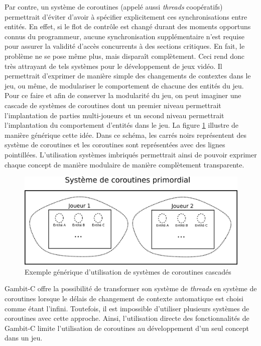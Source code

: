 \documentclass[12pt,oneside,letterpaper,francais]{book}
\begin{document}
Par contre, un système de coroutines (appelé aussi \textit{threads}
coopératifs) permettrait d'éviter d'avoir à spécifier explicitement
ces synchronisations entre entités. En effet, si le flot de contrôle
est changé durant des moments opportuns connus du programmeur, aucune
synchronisation supplémentaire n'est requise pour assurer la validité
d'accès concurrents à des sections critiques. En fait, le problème ne
se pose même plus, mais disparaît complètement. Ceci rend donc très
attrayant de tels systèmes pour le développement de jeux vidéo. Il
permettrait d'exprimer de manière simple des changements de contextes
dans le jeu, ou même, de modulariser le comportement de chacune des
entités du jeu. Pour ce faire et afin de conserver la modularité du
jeu, on peut imaginer une cascade de systèmes de coroutines dont un
premier niveau permettrait l'implantation de parties multi-joueurs et
un second niveau permettrait l'implantation du comportement d'entités
dans le jeu. La figure \ref{Corout:usecase} illustre de manière
générique cette idée. Dans ce schéma, les carrés noirs représentent
des système de coroutines et les coroutines sont représentées avec des
lignes pointillées. L'utilisation systèmes imbriqués permettrait ainsi
de pouvoir exprimer chaque concept de manière modulaire de manière
complètement transparente.

\begin{figure}[htb!]
  \center
  \includegraphics[scale=1.2]{corout-usecase-design}
  \caption{Exemple générique d'utilisation de systèmes de coroutines
    cascadés}
  \label{Corout:usecase}
\end{figure}

Gambit-C offre la possibilité de transformer son système de
\textit{threads} en système de coroutines lorsque le délais de
changement de contexte automatique est choisi comme étant
l'infini. Toutefois, il est impossible d'utiliser plusieurs systèmes
de coroutines avec cette approche. Ainsi, l'utilisation directe des
fonctionnalités de Gambit-C limite l'utilisation de coroutines au
développement d'un seul concept dans un jeu.
\end{document}
